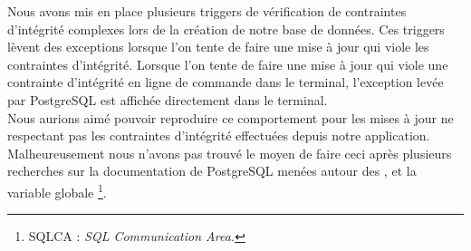 Nous avons mis en place plusieurs triggers de vérification de contraintes d'intégrité complexes lors de la création de notre base de données. Ces triggers lèvent des exceptions lorsque l'on tente de faire une mise à jour qui viole les contraintes d'intégrité. Lorsque l'on tente de faire une mise à jour qui viole une contrainte d'intégrité en ligne de commande dans le terminal, l'exception levée par PostgreSQL est affichée directement dans le terminal.\\

Nous aurions aimé pouvoir reproduire ce comportement pour les mises à jour ne respectant pas les contraintes d'intégrité effectuées depuis notre application. Malheureusement nous n'avons pas trouvé le moyen de faire ceci après plusieurs recherches sur la documentation de PostgreSQL menées autour des ,  et la variable globale \footnote{SQLCA : \textit{SQL Communication Area.}}.